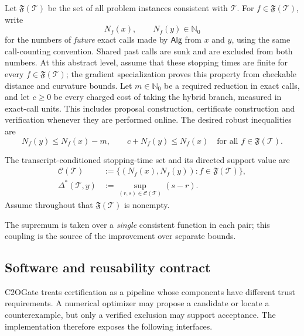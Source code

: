 \documentclass[smallextended]{svjour3}
\newcommand{\N}{\mathbb{N}}
\newcommand{\cT}{\mathcal{T}}
\newcommand{\cC}{\mathcal{C}}
\newcommand{\Alg}{\mathsf{Alg}}
\begin{document}
Let $\mathfrak F(\cT)$ be the set of all problem instances consistent with
$\cT$.  For $f\in\mathfrak F(\cT)$, write
\[
 N_f(x),\qquad N_f(y)\in\N_0
\]
for the numbers of \emph{future} exact calls made by $\Alg$ from $x$ and
$y$, using the same call-counting convention.  Shared past calls are sunk and
are excluded from both numbers.  At this abstract level, assume that these
stopping times are finite for every $f\in\mathfrak F(\cT)$; the gradient
specialization proves this property from checkable distance and curvature
bounds.  Let $m\in\N_0$ be a required reduction in
exact calls, and let $c\geq0$ be every charged cost of taking the hybrid branch,
measured in exact-call units.  This includes proposal construction,
certificate construction and verification whenever they are performed online.
The desired robust inequalities are
\begin{equation}
 N_f(y)\leq N_f(x)-m,
 \qquad c+N_f(y)\leq N_f(x)
 \quad\text{for all }f\in\mathfrak F(\cT).
 \label{eq:two-requirements}
\end{equation}

\begin{definition}
The transcript-conditioned stopping-time set and its directed support value are
\begin{align}
 \cC(\cT)
   &:=\{(N_f(x),N_f(y)):f\in\mathfrak F(\cT)\}, \label{eq:joint-set}\\
 \Delta^*(\cT,y)
   &:=\sup_{(r,s)\in\cC(\cT)}(s-r).                 \label{eq:delta}
\end{align}
Assume throughout that $\mathfrak F(\cT)$ is nonempty.
\end{definition}

The supremum is taken over a \emph{single} consistent function in each pair;
this coupling is the source of the improvement over separate bounds.

\subsection{Software and reusability contract}
\label{sec:software-contract}

C2OGate treats certification as a pipeline whose components have different
trust requirements.  A numerical optimizer may propose a candidate or locate
a counterexample, but only a verified exclusion may support acceptance.  The
implementation therefore exposes the following interfaces.
\end{document}
